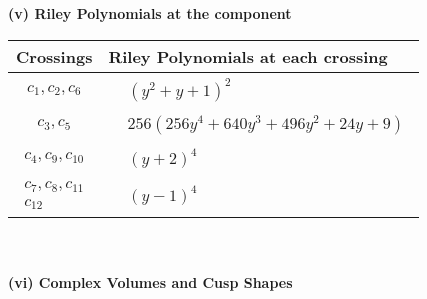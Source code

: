 \documentclass[1p]{elsarticle_modified}
\theoremstyle{definition}
\begin{document}
\newpage\renewcommand{\arraystretch}{1}
\flushleft \textbf{(v) Riley Polynomials at the component}\newline \\
\begin{tabular}{m{50pt}|m{274pt}}
Crossings & \hspace{64pt}Riley Polynomials at each crossing \\
\hline $$\begin{aligned}c_{1},c_{2},c_{6}\end{aligned}$$&$\begin{aligned}
&(y^2+y+1)^2
\end{aligned}$\\
\hline $$\begin{aligned}c_{3},c_{5}\end{aligned}$$&$\begin{aligned}
&256(256 y^4+640 y^3+496 y^2+24 y+9)
\end{aligned}$\\
\hline $$\begin{aligned}c_{4},c_{9},c_{10}\end{aligned}$$&$\begin{aligned}
&(y+2)^4
\end{aligned}$\\
\hline $$\begin{aligned}c_{7},c_{8},c_{11}\\c_{12}\end{aligned}$$&$\begin{aligned}
&(y-1)^4
\end{aligned}$\\
\hline
\end{tabular}\\~\\
\newpage\flushleft \textbf{(vi) Complex Volumes and Cusp Shapes}
\end{document}
